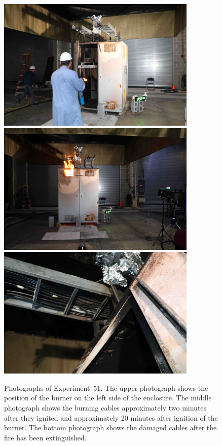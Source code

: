 \begin{figure}[p]
\centering
\includegraphics[height=2.50in]{../FIGURES/Test_51_setup} \\
\includegraphics[height=2.50in]{../FIGURES/Test_51_ignition} \\
\includegraphics[height=2.50in]{../FIGURES/Test_51_scar}
\caption[Photographs of Experiment~51]{Photographs of Experiment~51. The upper photograph shows the position of the burner on the left side of the enclosure. The middle photograph shows the burning cables approximately two minutes after they ignited and approximately 20 minutes after ignition of the burner. The bottom photograph shows the damaged cables after the fire has been extinguished.}
\label{fig:Test_51_photos}
\end{figure}


